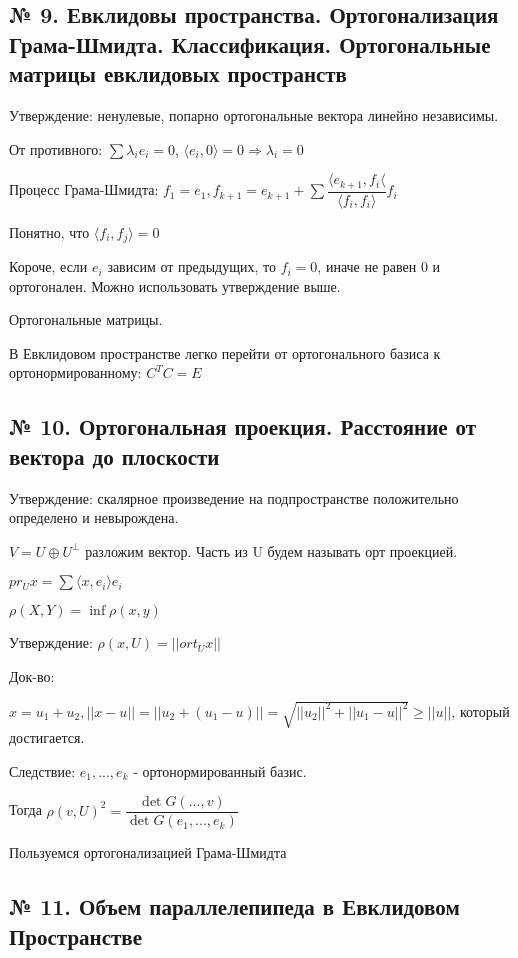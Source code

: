 \documentclass{article}
\begin{document}
\subsection{\tiny № 9. Евклидовы пространства. Ортогонализация Грама-Шмидта. Классификация. Ортогональные матрицы евклидовых пространств}

Утверждение: ненулевые, попарно ортогональные вектора линейно независимы.

От противного: $\sum{\lambda_i e_i} = 0$, $\langle e_i, 0 \rangle = 0 \Rightarrow \lambda_i = 0$

Процесс Грама-Шмидта: $f_1 = e_1, f_{k + 1} = e_{k + 1} + \sum{\dfrac{\langle e_{k + 1}, f_i \langle}{\langle f_i , f_i \rangle} f_i}$

Понятно, что $\langle f_i, f_j \rangle = 0$

Короче, если $e_i$ зависим от предыдущих, то $f_i = 0$, иначе не равен 0 и ортогонален. Можно использовать утверждение выше.

Ортогональные матрицы.

В Евклидовом пространстве легко перейти от ортогонального базиса к ортонормированному: $C^TC = E$

\subsection{\tiny № 10. Ортогональная проекция. Расстояние от вектора до плоскости}

Утверждение: скалярное произведение на подпространстве положительно определено и невырождена.

$V = U \oplus U^\perp$ разложим вектор. Часть из U будем называть орт проекцией.

$pr_Ux = \sum{\langle x, e_i \rangle}e_i$

$\rho(X, Y) = \inf{\rho(x, y)}$

Утверждение: $\rho(x, U) = ||ort_Ux||$

Док-во: 

$x = u_1 + u_2, ||x - u|| = ||u_2 + (u_1 - u)|| = \sqrt{||u_2||^2 + ||u_1 - u||^2} \geq ||u||$, который достигается.

Следствие: $e_1, ..., e_k$ - ортонормированный базис.

Тогда $\rho(v, U)^2 = \dfrac{\det{G(..., v)}}{\det{G(e_1, ... , e_k)}}$

Пользуемся ортогонализацией Грама-Шмидта

\subsection{\tiny № 11. Объем параллелепипеда в Евклидовом Пространстве}
\end{document}
